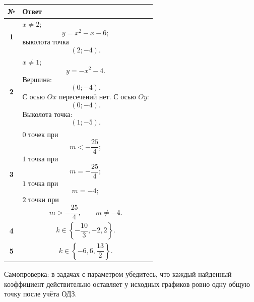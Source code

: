 \documentclass[a4paper,12pt]{article}
\begin{document}
\begin{table}[h]
\centering

\begin{tabularx}{\linewidth}{@{}>{\bfseries}c X@{}}

\toprule
№ & Ответ \\
\midrule

1 &
$x\ne2$;
\[
y=x^2-x-6;
\]
выколота точка
\[
(2;-4).
\]
\\

2 &
$x\ne1$;
\[
y=-x^2-4.
\]
Вершина:
\[
(0;-4).
\]
С осью $Ox$ пересечений нет.
С осью $Oy$:
\[
(0;-4).
\]
Выколота точка:
\[
(1;-5).
\]
\\

3 &
$0$ точек при
\[
m<-\frac{25}{4};
\]
$1$ точка при
\[
m=-\frac{25}{4};
\]
$1$ точка при
\[
m=-4;
\]
$2$ точки при
\[
m>-\frac{25}{4},
\qquad
m\ne-4.
\]
\\

4 &
\[
k\in
\left\{
-\frac{10}{3},
-2,
2
\right\}.
\]
\\

5 &
\[
k\in
\left\{
-6,
6,
\frac{13}{2}
\right\}.
\]
\\

\bottomrule

\end{tabularx}

\end{table}

\vfill

{\small\color{darkaccent}
Самопроверка: в задачах с параметром убедитесь, что каждый найденный коэффициент действительно оставляет у исходных графиков ровно одну общую точку после учёта ОДЗ.
}
\end{document}
